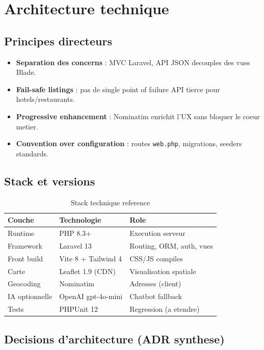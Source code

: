 \chapter{Architecture technique}
\label{ch:arch}

\section{Principes directeurs}

\begin{itemize}
  \item \textbf{Separation des concerns} : MVC Laravel, API JSON decouples des vues Blade.
  \item \textbf{Fail-safe listings} : pas de single point of failure API tierce pour hotels/restaurants.
  \item \textbf{Progressive enhancement} : Nominatim enrichit l'UX sans bloquer le coeur metier.
  \item \textbf{Convention over configuration} : routes \texttt{web.php}, migrations, seeders standards.
\end{itemize}

\section{Stack et versions}

\begin{table}[H]
\centering
\caption{Stack technique reference}
\begin{tabular}{@{}llp{6.5cm}@{}}
\toprule
\textbf{Couche} & \textbf{Technologie} & \textbf{Role} \\
\midrule
Runtime & PHP 8.3+ & Execution serveur \\
Framework & Laravel 13 & Routing, ORM, auth, vues \\
Front build & Vite 8 + Tailwind 4 & CSS/JS compiles \\
Carte & Leaflet 1.9 (CDN) & Visualisation spatiale \\
Geocoding & Nominatim & Adresses (client) \\
IA optionnelle & OpenAI gpt-4o-mini & Chatbot fallback \\
Tests & PHPUnit 12 & Regression (a etendre) \\
\bottomrule
\end{tabular}
\end{table}

\section{Decisions d'architecture (ADR synthese)}

